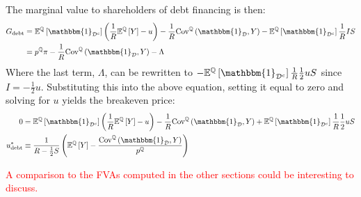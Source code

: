 \documentclass[../main.tex]{subfiles}
\begin{document}
        The marginal value to shareholders of debt financing is then:
            \begin{align}
                G_{\text{debt}} 
                &=
                    \mathbb{E}^{\mathbb{Q}}\left[\mathbbm{1}_{\mathcal{D}^{c}}\right] 
                    \left(
                        \discountfactor
                        \mathbb{E}^{\mathbb{Q}}\left[Y\right] 
                        - u
                    \right)
                    -
                    \discountfactor
                    \text{Cov}^{\mathbb{Q}}\left(\mathbbm{1}_{\mathcal{D}}, Y\right) 
                    - 
                    \mathbb{E}^{\mathbb{Q}}\left[
                        \mathbbm{1}_{\mathcal{D}^{c}}
                    \right] \discountfactor I S
                    \nonumber \\
                &=
                    p^{\mathbb{Q}} \pi 
                    - \discountfactor 
                    \text{Cov}^{\mathbb{Q}}\left(
                        \mathbbm{1}_{\mathcal{D}}, 
                        Y
                    \right) 
                    - \Lambda
            \end{align}
        Where the last term, $\Lambda$, can be rewritten to 
        $-\mathbb{E}^{\mathbb{Q}}\left[
            \mathbbm{1}_{\mathcal{D}^{c}}
        \right] \discountfactor \frac{1}{2} u S$
        since $I = -\frac{1}{2} u$.
        Substituting this into the above equation, setting it equal to zero 
        and solving for $u$ yields the breakeven price:
            \begin{align}
                0
                &=
                    \mathbb{E}^{\mathbb{Q}}\left[\mathbbm{1}_{\mathcal{D}^{c}}\right] 
                    \left(
                        \discountfactor
                        \mathbb{E}^{\mathbb{Q}}\left[Y\right] 
                        - u
                    \right)
                    -
                    \discountfactor
                    \text{Cov}^{\mathbb{Q}}\left(\mathbbm{1}_{\mathcal{D}}, Y\right) 
                    +
                    \mathbb{E}^{\mathbb{Q}}\left[
                        \mathbbm{1}_{\mathcal{D}^{c}}
                    \right] \discountfactor \frac{1}{2} u S
                    \nonumber \\
                u^{\ast}_{\text{debt}}
                &\equiv
                    \frac{
                        1
                    }{
                        \grossrfrate - \frac{1}{2} S
                    } 
                    \left(
                        \mathbb{E}^{\mathbb{Q}}\left[Y\right]
                        - \frac{
                            \text{Cov}^{\mathbb{Q}}\left(\mathbbm{1}_{\mathcal{D}}, Y\right)
                        }{
                            p^{\mathbb{Q}}  
                        } 
                    \right)
            \end{align}

        \textcolor{red}{A comparison to the FVAs computed in the other sections could be interesting to discuss.}
        
\end{document}
